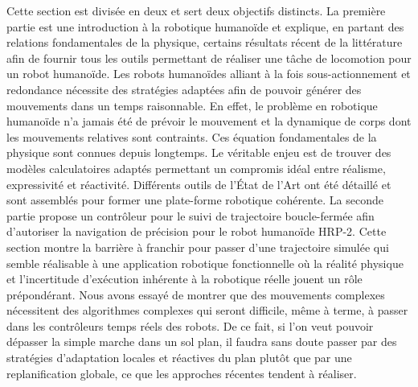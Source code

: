 Cette section est divisée en deux et sert deux objectifs distincts. La
première partie est une introduction à la robotique humanoïde et
explique, en partant des relations fondamentales de la physique,
certains résultats récent de la littérature afin de fournir tous les
outils permettant de réaliser une tâche de locomotion pour un robot
humanoïde. Les robots humanoïdes alliant à la fois sous-actionnement
et redondance nécessite des stratégies adaptées afin de pouvoir
générer des mouvements dans un temps raisonnable. En effet, le
problème en robotique humanoïde n'a jamais été de prévoir le mouvement
et la dynamique de corps dont les mouvements relatives sont
contraints. Ces équation fondamentales de la physique sont connues
depuis longtemps. Le véritable enjeu est de trouver des modèles
calculatoires adaptés permettant un compromis idéal entre réalisme,
expressivité et réactivité. Différents outils de l'État de l'Art ont
été détaillé et sont assemblés pour former une plate-forme robotique
cohérente. La seconde partie propose un contrôleur pour le suivi de
trajectoire boucle-fermée afin d'autoriser la navigation de précision
pour le robot humanoïde HRP-2. Cette section montre la barrière à
franchir pour passer d'une trajectoire simulée qui semble réalisable à
une application robotique fonctionnelle où la réalité physique et
l'incertitude d'exécution inhérente à la robotique réelle jouent un
rôle prépondérant. Nous avons essayé de montrer que des mouvements
complexes nécessitent des algorithmes complexes qui seront difficile,
même à terme, à passer dans les contrôleurs temps réels des robots. De
ce fait, si l'on veut pouvoir dépasser la simple marche dans un sol
plan, il faudra sans doute passer par des stratégies d'adaptation
locales et réactives du plan plutôt que par une replanification
globale, ce que les approches récentes tendent à réaliser.
